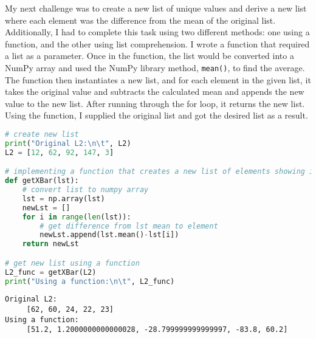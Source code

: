 \documentclass[journal]{IEEEtran}
\begin{document}
My next challenge was to create a new list of unique values and derive a new list where each element was the difference from the mean of the original list. Additionally, I had to complete this task using two different methods: one using a function, and the other using list comprehension. I wrote a function that required a list as a parameter. Once in the function, the list would be converted into a NumPy array and used the NumPy library method, \lstinline{mean()}, to find the average. The function then instantiates a new list, and for each element in the given list, it takes the original value and subtracts the calculated mean and appends the new value to the new list. After running through the for loop, it returns the new list. Using the function, I supplied the original list and got the desired list as a result.
\begin{lstlisting}[language=Python, caption=Modifying Lists with Functions]
# create new list 
print("Original L2:\n\t", L2)
L2 = [12, 62, 92, 147, 3]

# implementing a function that creates a new list of elements showing its difference from the average of the list
def getXBar(lst):
    # convert list to numpy array 
    lst = np.array(lst)
    newLst = [] 
    for i in range(len(lst)):
        # get difference from lst mean to element
        newLst.append(lst.mean()-lst[i])
    return newLst

# get new list using a function
L2_func = getXBar(L2)
print("Using a function:\n\t", L2_func)
\end{lstlisting}
\begin{lstlisting}[caption=List Output]
Original L2:
	 [62, 60, 24, 22, 23]
Using a function:
	 [51.2, 1.2000000000000028, -28.799999999999997, -83.8, 60.2]

\end{lstlisting}
\end{document}
